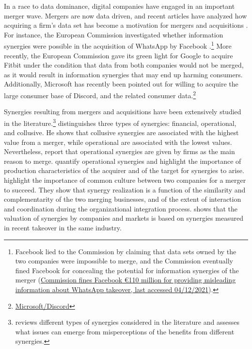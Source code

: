 \documentclass[a4paper,leqno]{article}%
\begin{document}
In a race to data dominance, digital companies have engaged in an important merger wave. Mergers are now data driven, and recent articles have analyzed how acquiring a firm's data set has become a motivation for mergers and acquisitions \citep{stucke2016introduction}. For instance, the European Commission investigated whether information synergies were possible in the acquisition of WhatsApp by Facebook \citep{argentesi2019merger}.\footnote{Facebook lied to the Commission by claiming that data sets owned by the two companies were impossible to merge, and the Commission eventually fined Facebook for concealing the potential for information synergies of the merger (\href{https://ec.europa.eu/commission/presscorner/detail/pl/IP_17_1369}{Commission fines Facebook €110 million for providing misleading information about WhatsApp takeover, last accessed 04/12/2021}).} More recently, the European Commission gave its green light for Google to acquire Fitbit under the condition that data from both companies would not be merged, as it would result in information synergies that may end up harming consumers. Additionally, Microsoft has recently been pointed out for willing to acquire the large consumer base of Discord, and the related consumer data.\footnote{\href{https://www.lemonde.fr/economie/article/2021/04/08/microsoft-convoite-le-service-de-discussion-discord_6076070_3234.html}{Microsoft/Discord}} 



Synergies resulting from mergers and acquisitions have been extensively studied in the literature.\footnote{\cite{damodaran2005value} reviews different types of synergies considered in the literature and assesses what issues can emerge from misperceptions of the benefits from different synergies.} \cite{chatterjee1986types} distinguishes three types of synergies: financial, operational, and collusive. He shows that collusive synergies are associated with the highest value from a merger, while operational are associated with the lowest values. Nevertheless, \cite{mukherjee2004merger} report that operational synergies are given by firms as the main reason to merge. \cite{gupta2002quantifying} quantify operational synergies and highlight the importance of production characteristics of the acquirer and of the target for synergies to arise. \cite{larsson1999integrating} highlight the importance of common culture between two companies for a merger to succeed. They show that synergy realization is a function of the similarity and complementarity of the two merging businesses, and of the extent of interaction and coordination during the organizational integration process. \cite{madura2008clustered} shows that the valuation of synergies by companies and markets is based on synergies measured in recent takeover in the same industry.
\end{document}
